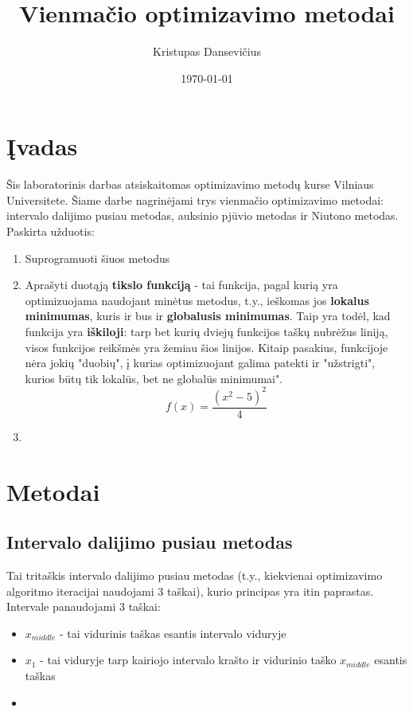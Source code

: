 \documentclass[a4paper,12pt]{article}
\title{Vienmačio optimizavimo metodai}
\author{Kristupas Dansevičius}
\date{\today}
\begin{document}
\maketitle
\tableofcontents

\section{Įvadas}
Šis laboratorinis darbas atsiskaitomas optimizavimo metodų kurse Vilniaus Universitete. 
Šiame darbe nagrinėjami trys vienmačio optimizavimo metodai:
intervalo dalijimo pusiau metodas, auksinio pjūvio metodas ir Niutono metodas. Paskirta užduotis:

\begin{enumerate}
    \item Suprogramuoti šiuos metodus
    \item Aprašyti duotąją \textbf{tikslo funkciją} - tai funkcija, pagal kurią yra optimizuojama naudojant minėtus metodus, t.y., ieškomas jos \textbf{lokalus minimumas}, kuris ir bus ir \textbf{globalusis minimumas}. Taip yra todėl, kad funkcija yra \textbf{iškiloji}: tarp bet kurių dviejų funkcijos taškų nubrėžus liniją, visos funkcijos reikšmės yra žemiau šios linijos. Kitaip pasakius, funkcijoje nėra jokių "duobių", į kurias optimizuojant galima patekti ir "užstrigti", kurios būtų tik lokalūs, bet ne globalūs minimumai".  
        \begin{equation}
            f(x) = \frac{(x^2 - 5)^2}{4}
        \end{equation}
    \item 
\end{enumerate}



\section{Metodai}
\subsection{Intervalo dalijimo pusiau metodas}
Tai tritaškis intervalo dalijimo pusiau metodas (t.y., kiekvienai optimizavimo algoritmo iteracijai naudojami 3 taškai), kurio principas yra itin paprastas. Intervale panaudojami 3 taškai:
\begin{itemize}
    \item $x_{middle}$ - tai vidurinis taškas esantis intervalo viduryje
    \item $x_1$ - tai viduryje tarp kairiojo intervalo krašto ir vidurinio taško $x_{middle}$ esantis taškas
    \item 
\end{itemize}
\end{document}
